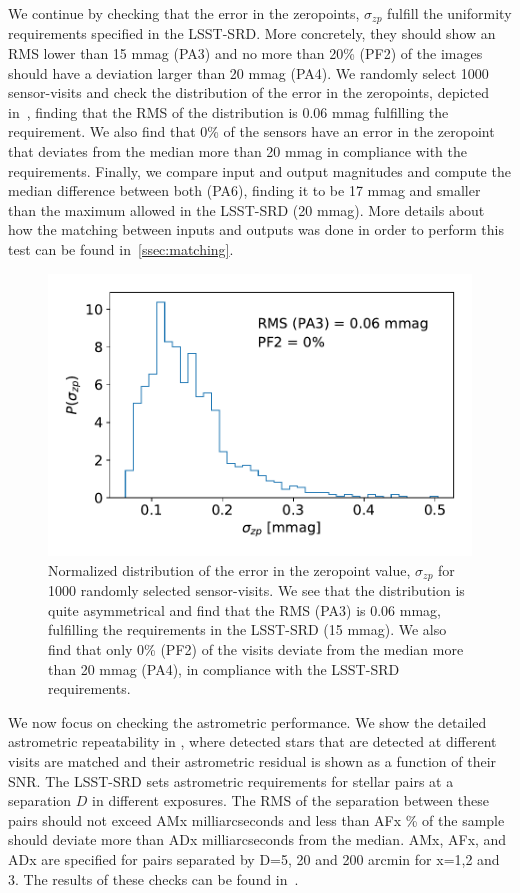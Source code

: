 \documentclass[twocolumn]{aastex62}
\begin{document}
We continue by checking that the error in the zeropoints, $\sigma_{zp}$ fulfill the uniformity requirements specified in the LSST-SRD. More concretely, they should show an RMS lower than 15 mmag (PA3) and no more than 20\% (PF2) of the images should have a deviation larger than 20 mmag (PA4). We randomly select 1000 sensor-visits and check the distribution of the error in the zeropoints, depicted in~, finding that the RMS of the distribution is 0.06 mmag fulfilling the requirement. We also find that 0\% of the sensors have an error in the zeropoint that deviates from the median more than 20 mmag in compliance with the requirements. Finally, we compare input and output magnitudes and compute the median difference between both (PA6), finding it to be 17 mmag and smaller than the maximum allowed in the LSST-SRD (20 mmag). More details about how the matching between inputs and outputs was done in order to perform this test can be found in~\ref{ssec:matching}.

\begin{figure}
\centering
\includegraphics[width=0.9\columnwidth]{PA234.pdf}
\caption{Normalized distribution of the error in the zeropoint value, $\sigma_{zp}$ for 1000 randomly selected sensor-visits. We see that the distribution is quite asymmetrical and find that the RMS (PA3) is 0.06 mmag, fulfilling the requirements in the LSST-SRD (15 mmag). We also find that only 0\% (PF2) of the visits deviate from the median more than 20 mmag (PA4), in compliance with the LSST-SRD requirements.}
\label{fig:PA34}
\end{figure}

We now focus on checking the astrometric performance.  We show the detailed astrometric repeatability in , where detected stars that are detected at different visits are matched and their astrometric residual is shown as a function of their SNR. The LSST-SRD sets astrometric requirements for stellar pairs at a separation $D$ in different exposures. The RMS of the separation between these pairs should not exceed AMx milliarcseconds and less than AFx \% of the sample should deviate more than ADx milliarcseconds from the median. AMx, AFx, and ADx are specified for pairs separated by D=5, 20 and 200 arcmin for x=1,2 and 3. The results of these checks can be found in~.
\end{document}
